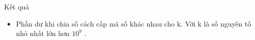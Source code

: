 Kết quả
\begin{itemize}
	\item     Phần dư khi chia số cách cấp mã số khác nhau cho k. Với k là số nguyên tố nhỏ nhất lớn hơn $10^{9}$    .   
\end{itemize}